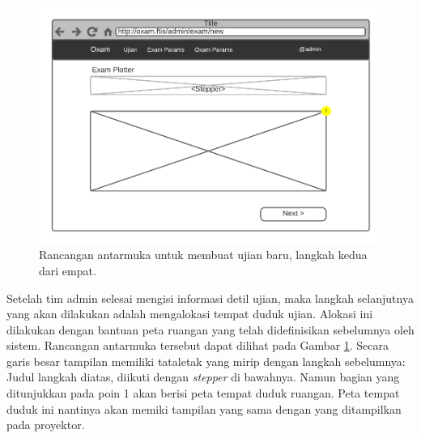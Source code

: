     
    \begin{figure}
        \centering
        \includegraphics{Gambar/mockups/Mockup--Admin - NewExam-Step 2.pdf}
        \caption{Rancangan antarmuka untuk membuat ujian baru, langkah kedua dari empat.}
        \label{fig:mockup_admin_exam_create-2}
    \end{figure}
    
    Setelah tim admin selesai mengisi informasi detil ujian, maka langkah selanjutnya yang akan dilakukan adalah 
    mengalokasi tempat duduk ujian. Alokasi ini dilakukan dengan bantuan peta ruangan yang telah didefinisikan
    sebelumnya oleh sistem. Rancangan antarmuka tersebut dapat dilihat pada Gambar \ref{fig:mockup_admin_exam_create-2}.
    Secara garis besar tampilan memiliki tataletak yang mirip dengan langkah sebelumnya: Judul langkah diatas, diikuti
    dengan \textit{stepper} di bawahnya. Namun bagian yang ditunjukkan pada poin 1 akan berisi peta tempat duduk
    ruangan. Peta tempat duduk ini nantinya akan memiki tampilan yang sama dengan yang ditampilkan pada proyektor.
    
